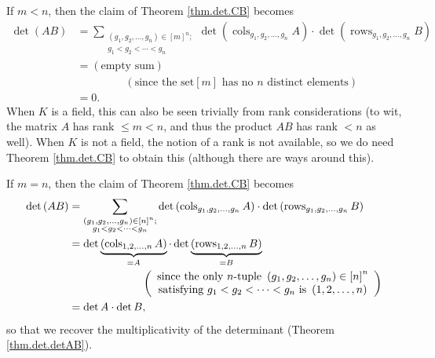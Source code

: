 \begin{remark}
If $m<n$, then the claim of Theorem \ref{thm.det.CB} becomes%
\begin{align*}
\det\left(  AB\right)   &  =\sum_{\substack{\left(  g_{1},g_{2},\ldots
,g_{n}\right)  \in\left[  m\right]  ^{n};\\g_{1}<g_{2}<\cdots<g_{n}}%
}\det\left(  \operatorname*{cols}\nolimits_{g_{1},g_{2},\ldots,g_{n}}A\right)
\cdot\det\left(  \operatorname*{rows}\nolimits_{g_{1},g_{2},\ldots,g_{n}%
}B\right) \\
&  =\left(  \text{empty sum}\right) \\
&  \ \ \ \ \ \ \ \ \ \ \ \ \ \ \ \ \ \ \ \ \left(  \text{since the set
}\left[  m\right]  \text{ has no }n\text{ distinct elements}\right) \\
&  =0.
\end{align*}
When $K$ is a field, this can also be seen trivially from rank considerations
(to wit, the matrix $A$ has rank $\leq m<n$, and thus the product $AB$ has
rank $<n$ as well). When $K$ is not a field, the notion of a rank is not
available, so we do need Theorem \ref{thm.det.CB} to obtain this (although
there are ways around this).

If $m=n$, then the claim of Theorem \ref{thm.det.CB} becomes%
\begin{align*}
\det\left(  AB\right)   &  =\sum_{\substack{\left(  g_{1},g_{2},\ldots
,g_{n}\right)  \in\left[  n\right]  ^{n};\\g_{1}<g_{2}<\cdots<g_{n}}%
}\det\left(  \operatorname*{cols}\nolimits_{g_{1},g_{2},\ldots,g_{n}}A\right)
\cdot\det\left(  \operatorname*{rows}\nolimits_{g_{1},g_{2},\ldots,g_{n}%
}B\right) \\
&  =\det\underbrace{\left(  \operatorname*{cols}\nolimits_{1,2,\ldots
,n}A\right)  }_{=A}\cdot\det\underbrace{\left(  \operatorname*{rows}%
\nolimits_{1,2,\ldots,n}B\right)  }_{=B}\\
&  \ \ \ \ \ \ \ \ \ \ \ \ \ \ \ \ \ \ \ \ \left(
\begin{array}
[c]{c}%
\text{since the only }n\text{-tuple }\left(  g_{1},g_{2},\ldots,g_{n}\right)
\in\left[  n\right]  ^{n}\\
\text{satisfying }g_{1}<g_{2}<\cdots<g_{n}\text{ is }\left(  1,2,\ldots
,n\right)
\end{array}
\right) \\
&  =\det A\cdot\det B,
\end{align*}
so that we recover the multiplicativity of the determinant (Theorem
\ref{thm.det.detAB}).
\end{remark}

